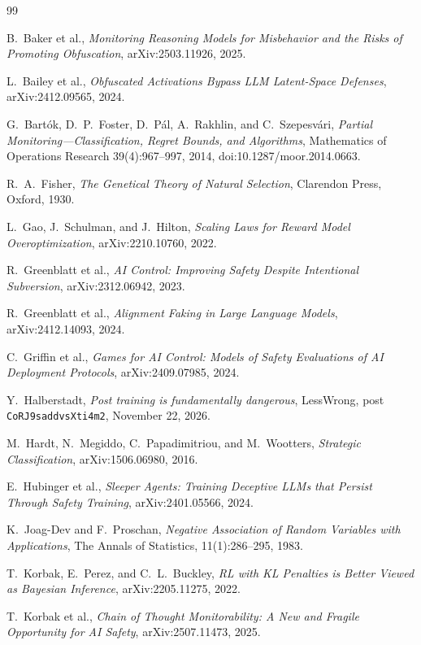 \documentclass[11pt,a4paper]{article}
\begin{document}
\begin{thebibliography}{99}

B.~Baker et al.,
\emph{Monitoring Reasoning Models for Misbehavior and the Risks of Promoting Obfuscation},
arXiv:2503.11926, 2025.

L.~Bailey et al.,
\emph{Obfuscated Activations Bypass LLM Latent-Space Defenses},
arXiv:2412.09565, 2024.

G.~Bart\'ok, D.~P.~Foster, D.~P\'al, A.~Rakhlin, and C.~Szepesv\'ari,
\emph{Partial Monitoring---Classification, Regret Bounds, and Algorithms},
Mathematics of Operations Research 39(4):967--997, 2014, doi:10.1287/moor.2014.0663.

R.~A.~Fisher,
\emph{The Genetical Theory of Natural Selection},
Clarendon Press, Oxford, 1930.

L.~Gao, J.~Schulman, and J.~Hilton,
\emph{Scaling Laws for Reward Model Overoptimization},
arXiv:2210.10760, 2022.

R.~Greenblatt et al.,
\emph{AI Control: Improving Safety Despite Intentional Subversion},
arXiv:2312.06942, 2023.

R.~Greenblatt et al.,
\emph{Alignment Faking in Large Language Models},
arXiv:2412.14093, 2024.

C.~Griffin et al.,
\emph{Games for AI Control: Models of Safety Evaluations of AI Deployment Protocols},
arXiv:2409.07985, 2024.

Y.~Halberstadt,
\emph{Post training is fundamentally dangerous},
LessWrong, post \texttt{CoRJ9saddvsXti4m2}, November 22, 2026.

M.~Hardt, N.~Megiddo, C.~Papadimitriou, and M.~Wootters,
\emph{Strategic Classification},
arXiv:1506.06980, 2016.

E.~Hubinger et al.,
\emph{Sleeper Agents: Training Deceptive LLMs that Persist Through Safety Training},
arXiv:2401.05566, 2024.

K.~Joag-Dev and F.~Proschan,
\emph{Negative Association of Random Variables with Applications},
The Annals of Statistics, 11(1):286--295, 1983.

T.~Korbak, E.~Perez, and C.~L.~Buckley,
\emph{RL with KL Penalties is Better Viewed as Bayesian Inference},
arXiv:2205.11275, 2022.

T.~Korbak et al.,
\emph{Chain of Thought Monitorability: A New and Fragile Opportunity for AI Safety},
arXiv:2507.11473, 2025.


\end{thebibliography}
\end{document}
